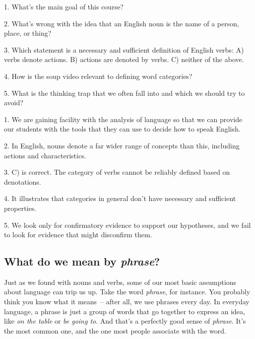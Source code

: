 \clearpage
\begin{tcolorbox}[title=Questions, colback=white]
1. What's the main goal of this course?

2. What's wrong with the idea that an English noun is the name of a person, place, or thing?

3. Which statement is a necessary and sufficient definition of English verbs: A) verbs denote actions. B) actions are denoted by verbs. C) neither of the above.

4. How is the soup video relevant to defining word categories?

5. What is the thinking trap that we often fall into and which we should try to avoid?
\end{tcolorbox}

\begin{tcolorbox}[title=Answers, colback=white]
1. We are gaining facility with the analysis of language so that we can provide our students with the tools that they can use to decide how to speak English.

2. In English, nouns denote a far wider range of concepts than this, including actions and characteristics.

3. C) is correct. The category of verbs cannot be reliably defined based on denotations.

4. It illustrates that categories in general don't have necessary and sufficient properties.

5. We look only for confirmatory evidence to support our hypotheses, and we fail to look for evidence that might disconfirm them.
\end{tcolorbox}

\subsection{What do we mean by \textit{phrase}?}\label{sec:phrases}

Just as we found with nouns and verbs, some of our most basic assumptions about language can trip us up. Take the word \textit{phrase}, for instance. You probably think you know what it means~-- after all, we use phrases every day. In everyday language, a phrase is just a group of words that go together to express an idea, like \textit{on the table} or \textit{be going to}. And that's a perfectly good sense of \textit{phrase}. It's the most common one, and the one most people associate with the word.

